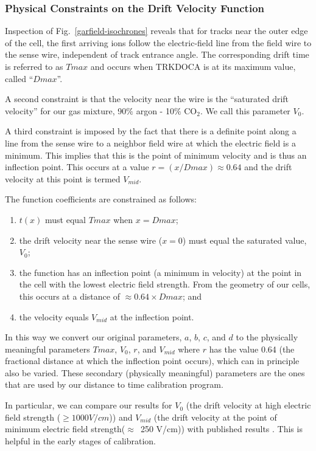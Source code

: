 \subsubsection{Physical Constraints on the Drift Velocity Function}

Inspection of Fig.~\ref{garfield-isochrones} reveals that for tracks near the outer
edge of the cell, the first arriving ions follow the electric-field line from 
the field wire to the sense wire, independent of track entrance angle.  The
corresponding drift time is referred to as $Tmax$ and occurs when TRKDOCA is at its maximum value,
called ``$Dmax$''.

A second constraint is that the velocity near the wire is the ``saturated drift velocity'' for our gas
mixture, 90$\%$ argon - 10$\%$ CO$_2$.  We call this parameter $V_0$.

A third constraint is imposed by the fact that there is a definite point along
a line from the sense wire to a neighbor field wire at which the electric field 
is a minimum. This implies that this is the point
of minimum velocity and is thus an inflection point. This occurs at a value
$r = (x/Dmax) \approx 0.64$ and the drift velocity at this point is termed $V_{mid}$.

The function coefficients are constrained as follows:
\begin{enumerate}
\item  $t(x)$ must equal $Tmax$ when $x = Dmax $;
\item  the drift velocity near the sense wire ($x = 0$)
must equal the saturated value, $V_0$;
\item the function has an inflection point (a
minimum in velocity) at the point in the cell with the lowest electric field
strength.  From the geometry of our cells, this occurs at a distance
of $\approx 0.64 \times Dmax$; and
\item the velocity equals $V_{mid}$ at the inflection point.
\end{enumerate}

In this way we convert our original parameters, $a$, $b$, $c$, and $d$ to the physically meaningful
parameters $Tmax$, $V_0$, $r$, and $V_{mid}$ where $r$ has the value 0.64 (the fractional distance
at which the inflection point occurs), which can in principle also be varied.
These secondary (physically meaningful) parameters are the ones that are used
by our distance to time calibration program.

In particular, we can compare our results for $V_0$ (the drift velocity at high electric field strength
($\geq 1000 V/cm$)) and $V_{mid}$ (the drift velocity at the point of minimum electric field strength($\approx$~250 V/cm))
with published results \cite{drift-velocity-results}.  This is helpful in the early stages of calibration.

